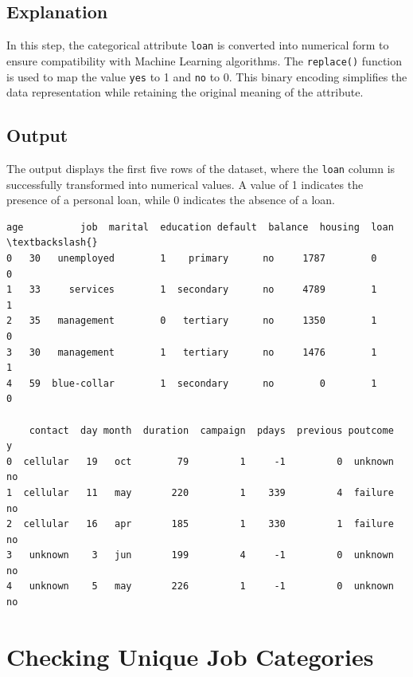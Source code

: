 \documentclass[11pt,a4paper]{report}
\makeatletter
\newcommand{\boxspacing}{\kern\kvtcb@left@rule\kern\kvtcb@boxsep}
\newcommand{\prompt}[4]{
        {\ttfamily\llap{{\color{#2}[#3]:\hspace{3pt}#4}}\vspace{-\baselineskip}}
    }
\makeatother
\begin{document}
\subsection*{Explanation}
In this step, the categorical attribute \texttt{loan} is converted into numerical form to ensure compatibility with Machine Learning algorithms. The \texttt{replace()} function is used to map the value \texttt{yes} to 1 and \texttt{no} to 0. This binary encoding simplifies the data representation while retaining the original meaning of the attribute.

\subsection*{Output}
The output displays the first five rows of the dataset, where the \texttt{loan} column is successfully transformed into numerical values. A value of 1 indicates the presence of a personal loan, while 0 indicates the absence of a loan.

\begin{tcolorbox}[breakable, size=fbox, boxrule=.5pt, pad at break*=1mm, opacityfill=0]
\prompt{Out}{outcolor}{7}{\boxspacing}
\begin{Verbatim}[commandchars=\\\{\}]
   age          job  marital  education default  balance  housing  loan  \textbackslash{}
0   30   unemployed        1    primary      no     1787        0     0
1   33     services        1  secondary      no     4789        1     1
2   35   management        0   tertiary      no     1350        1     0
3   30   management        1   tertiary      no     1476        1     1
4   59  blue-collar        1  secondary      no        0        1     0

    contact  day month  duration  campaign  pdays  previous poutcome   y
0  cellular   19   oct        79         1     -1         0  unknown  no
1  cellular   11   may       220         1    339         4  failure  no
2  cellular   16   apr       185         1    330         1  failure  no
3   unknown    3   jun       199         4     -1         0  unknown  no
4   unknown    5   may       226         1     -1         0  unknown  no
\end{Verbatim}
\end{tcolorbox}
        
\section{Checking Unique Job Categories}    
        
\end{document}
